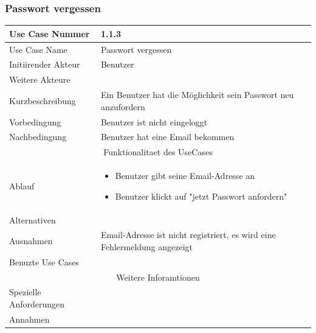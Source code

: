 \documentclass[10pt,a4paper]{article}
\begin{document}
	\subsubsection{Passwort vergessen}
		\begin{tabular}{|l|p{.5\linewidth}|}
		\hline Use Case Nummer & 1.1.3 \\ 
		\hline Use Case Name & Passwort vergessen \\ 
		\hline Initiirender Akteur & Benutzer \\
		\hline Weitere Akteure &  \\
		\hline Kurzbeschreibung & Ein Benutzer hat die M\"oglichkeit sein Passwort neu anzufordern \\
		\hline Vorbedingung & Benutzer ist nicht eingeloggt \\
		\hline Nachbedingung & Benutzer hat eine Email bekommen \\
		\hline \multicolumn{2}{|c|}{Funktionalitaet des UseCases}\\
		\hline Ablauf & \begin{itemize}
			\item Benutzer gibt seine Email-Adresse an
			\item Benutzer klickt auf "jetzt Passwort anfordern"
		\end{itemize} \\
		\hline Alternativen &  \\
		\hline Ausnahmen & Email-Adresse ist nicht registriert, es wird eine Fehlermeldung angezeigt \\
		\hline Benuzte Use Cases &  \\
		\hline \multicolumn{2}{|c|}{Weitere Inforamtionen} \\
		\hline Spezielle Anforderungen &  \\
		\hline Annahmen &  \\
		\hline
		\end{tabular}
\end{document}
